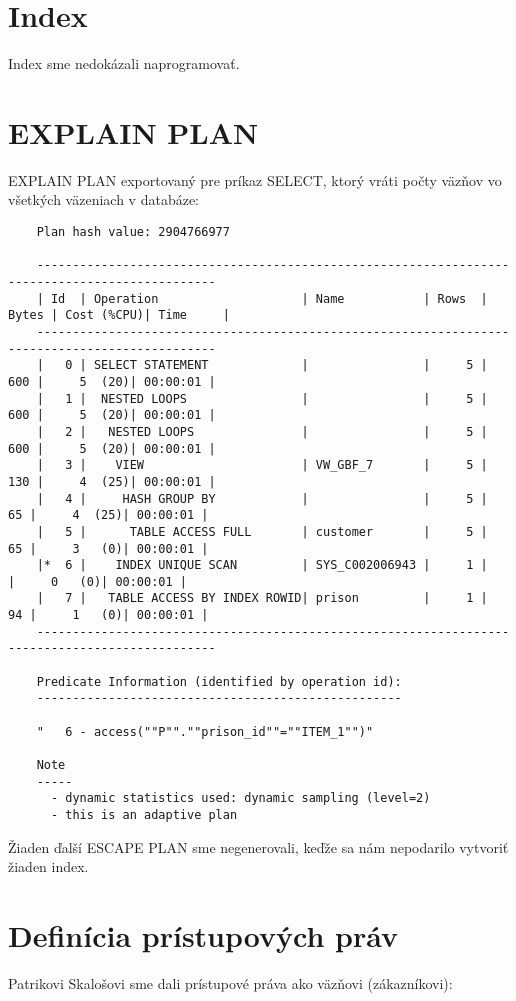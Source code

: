 \documentclass[a4paper]{article}
\begin{document}
  \section{Index}
  Index sme nedokázali naprogramovať.


  \section{EXPLAIN PLAN}
  EXPLAIN PLAN exportovaný pre príkaz SELECT, ktorý vráti počty väzňov vo 
  všetkých väzeniach v databáze:

  \begin{verbatim}
    Plan hash value: 2904766977

    -----------------------------------------------------------------------------------------------
    | Id  | Operation                    | Name           | Rows  | Bytes | Cost (%CPU)| Time     |
    -----------------------------------------------------------------------------------------------
    |   0 | SELECT STATEMENT             |                |     5 |   600 |     5  (20)| 00:00:01 |
    |   1 |  NESTED LOOPS                |                |     5 |   600 |     5  (20)| 00:00:01 |
    |   2 |   NESTED LOOPS               |                |     5 |   600 |     5  (20)| 00:00:01 |
    |   3 |    VIEW                      | VW_GBF_7       |     5 |   130 |     4  (25)| 00:00:01 |
    |   4 |     HASH GROUP BY            |                |     5 |    65 |     4  (25)| 00:00:01 |
    |   5 |      TABLE ACCESS FULL       | customer       |     5 |    65 |     3   (0)| 00:00:01 |
    |*  6 |    INDEX UNIQUE SCAN         | SYS_C002006943 |     1 |       |     0   (0)| 00:00:01 |
    |   7 |   TABLE ACCESS BY INDEX ROWID| prison         |     1 |    94 |     1   (0)| 00:00:01 |
    -----------------------------------------------------------------------------------------------

    Predicate Information (identified by operation id):
    ---------------------------------------------------

    "   6 - access(""P"".""prison_id""=""ITEM_1"")"

    Note
    -----
      - dynamic statistics used: dynamic sampling (level=2)
      - this is an adaptive plan
  \end{verbatim}

  Žiaden ďalší ESCAPE PLAN sme negenerovali, keďže sa nám nepodarilo vytvoriť 
  žiaden index.


  \section{Definícia prístupových práv}
  Patrikovi Skalošovi sme dali prístupové práva ako väzňovi (zákazníkovi):
\end{document}
